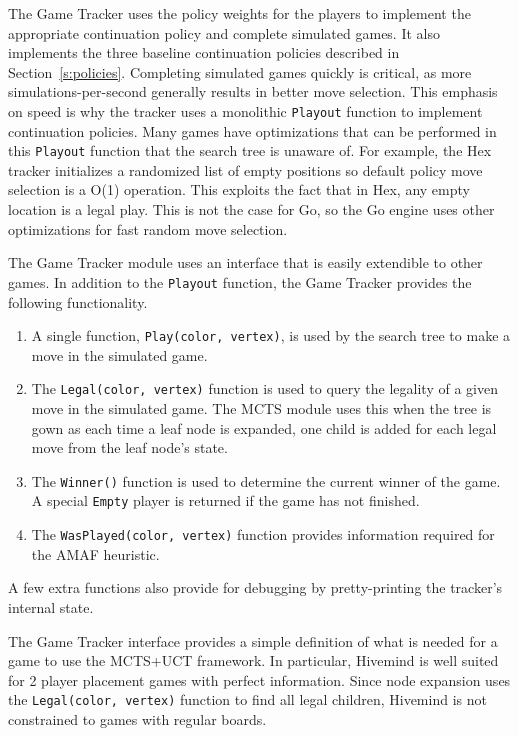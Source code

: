 \documentclass{acm_proc_article-sp}
\begin{document}
The Game Tracker uses the policy weights for the players to implement the appropriate continuation policy and complete simulated games. 
It also implements the three baseline continuation policies described in Section~\ref{s:policies}.
Completing simulated games quickly is critical, as more simulations-per-second generally results in better move selection. 
This emphasis on speed is why the tracker uses a monolithic \texttt{Playout} function
to implement continuation policies.
Many games have optimizations that can be performed in this \texttt{Playout} function that the search tree is unaware of. 
For example, the Hex tracker initializes a randomized list of empty positions so default policy move selection is a O(1) operation. 
This exploits the fact that in Hex, any empty location is a legal play. 
This is not the case for Go, so the Go engine uses other optimizations for fast random move selection.

The Game Tracker module uses an interface that is easily extendible to other games. 
In addition to the \texttt{Playout} function, the Game Tracker provides the following functionality.
\begin{enumerate}
\item A single function, \texttt{Play(color, vertex)}, is used by the search tree to make a move in the simulated game.
\item The \texttt{Legal(color, vertex)} function is used to query the legality of a given move in the simulated game. 
The MCTS module uses this when the tree is gown as each time a leaf node is expanded,
one child is added for each legal move from the leaf node's state.
\item The \texttt{Winner()} function is used to determine the current winner of the game. 
	A special \texttt{Empty} player is returned if the game has not finished.
\item The \texttt{WasPlayed(color, vertex)} function provides information required for the AMAF heuristic.
\end{enumerate}
A few extra functions also provide for debugging by pretty-printing the tracker's internal state.

The Game Tracker interface provides a simple definition of what is needed for a game to use the MCTS+UCT framework. 
In particular, Hivemind is well suited for 2 player placement games with perfect information. 
Since node expansion uses the \texttt{Legal(color, vertex)} function to find all legal children,
Hivemind is not constrained to games with regular boards.
\end{document}

